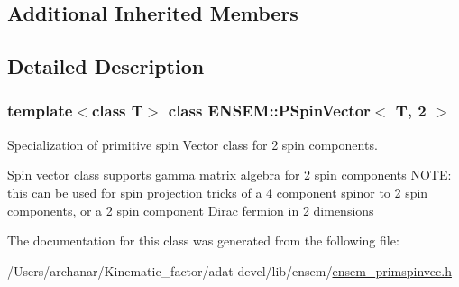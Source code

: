 \subsection*{Additional Inherited Members}


\subsection{Detailed Description}
\subsubsection*{template$<$class T$>$\newline
class E\+N\+S\+E\+M\+::\+P\+Spin\+Vector$<$ T, 2 $>$}

Specialization of primitive spin Vector class for 2 spin components. 

Spin vector class supports gamma matrix algebra for 2 spin components N\+O\+TE\+: this can be used for spin projection tricks of a 4 component spinor to 2 spin components, or a 2 spin component Dirac fermion in 2 dimensions 

The documentation for this class was generated from the following file\+:\begin{DoxyCompactItemize}
\item 
/\+Users/archanar/\+Kinematic\+\_\+factor/adat-\/devel/lib/ensem/\mbox{\hyperlink{adat-devel_2lib_2ensem_2ensem__primspinvec_8h}{ensem\+\_\+primspinvec.\+h}}\end{DoxyCompactItemize}
